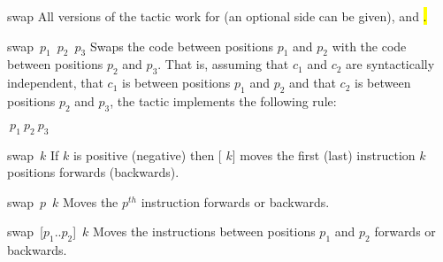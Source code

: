 \begin{tactic}{swap}
All versions of the tactic work for \prhl (an optional side can be given),
\phl and \hl.

\begin{tsyntax}{swap\ $p_1$\ $p_2$\ $p_3$}
  Swaps the code between positions $p_1$ and $p_2$ with the code between 
  positions $p_2$ and $p_3$. That is, assuming that $c_1$ and $c_2$ are 
  syntactically independent, that $c_1$ is between positions $p_1$ and $p_2$ 
  and that $c_2$ is between positions $p_2$ and $p_3$, the tactic implements 
  the following rule:

\begin{cmathpar}
\texample
  { $\ p_1\ p_2\ p_3$}
  {}
  {}
\end{cmathpar}
\end{tsyntax}

\begin{tsyntax}{swap\ $k$}
If $k$ is positive (negative) then [ $k$] moves the first
(last) instruction $k$ positions forwards (backwards). 
\end{tsyntax}

\begin{tsyntax}{swap\ $p$\ $k$}
Moves the $p^{th}$ instruction forwards or backwards.
\end{tsyntax}

\begin{tsyntax}{swap\ [$p_1$..$p_2$]\ $k$}
Moves the instructions between positions $p_1$ and $p_2$ forwards or backwards.
\end{tsyntax}









  



\end{tactic}
